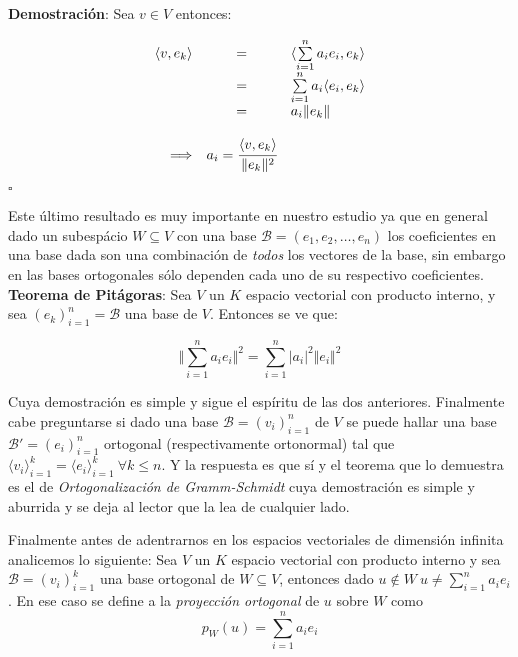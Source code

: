 \documentclass[a4paper,spanish]{article}
\numberwithin{equation}{section}
\begin{document}
\textbf{Demostraci\'on}: Sea $v \in V$ entonces:

\[
\begin{array}{rcl}
\langle{v,e_k}\rangle & = & \langle{\sum\limits_{i=1}^{n}{a_ie_i},e_k\rangle} \\
& = & \sum\limits_{i=1}^{n}{a_i\langle{e_i,e_k}\rangle} \\
& = & a_i \Vert{e_k}\Vert \\
& & \\
\Longrightarrow & a_i=\cfrac{\langle{v,e_k}\rangle}{\Vert{e_k}\Vert ^2} &
\end{array}
\]
\begin{flushright}
$\square$
\end{flushright}

Este \'ultimo resultado es muy importante en nuestro estudio ya que en general dado un subesp\'acio $W \subseteq V$ con una base $\mathcal{B}=\left({e_1,e_2,\dots,e_n}\right)$ los coeficientes en una base dada son una combinaci\'on de \textit{todos} los vectores de la base, sin embargo en las bases ortogonales s\'olo dependen cada uno de su respectivo coeficientes.\\

\textbf{Teorema de Pit\'agoras}: Sea $V$ un $K$ espacio vectorial con producto interno, y sea $\left({e_k}\right)_{i=1}^{n}=\mathcal{B}$ una base de $V$. Entonces se ve que:

\[\Vert{\sum\limits_{i=1}^{n}{a_ie_i}}\Vert ^2 = \sum_{i=1}^{n}{\vert{a_i}\vert ^2 \Vert{e_i}\Vert ^2} \]

Cuya demostraci\'on es simple y sigue el esp\'iritu de las dos anteriores. Finalmente cabe preguntarse si dado una base $\mathcal{B}=\left({v_i}\right)_{i=1}^{n}$ de $V$ se puede hallar una base $\mathcal{B'}=\left({e_i}\right)_{i=1}^{n}$ ortogonal (respectivamente ortonormal) tal que $\langle{v_i}\rangle_{i=1}^{k}=\langle{e_i}\rangle_{i=1}^{k}  \ \forall k\leq n$. Y la respuesta es que s\'i y el teorema que lo demuestra es el de \textit{Ortogonalizaci\'on de Gramm-Schmidt} cuya demostraci\'on es simple y aburrida y se deja al lector que la lea de cualquier lado. 

\medskip 

Finalmente antes de adentrarnos en los espacios vectoriales de dimensi\'on infinita analicemos lo siguiente: Sea $V$ un $K$ espacio vectorial con producto interno y sea $\mathcal{B}=\left({v_i}\right)_{i=1}^{k}$ una base ortogonal de $W \subseteq V$, entonces dado $u \notin W \ u \neq \sum\limits_{i=1}^{n}{a_ie_i}$. En ese caso se define a la \textit{proyecci\'on ortogonal} de $u$ sobre $W$ como
\[p_W \left({u}\right) = \sum\limits_{i=1}^{n}{a_ie_i} \]
\end{document}
